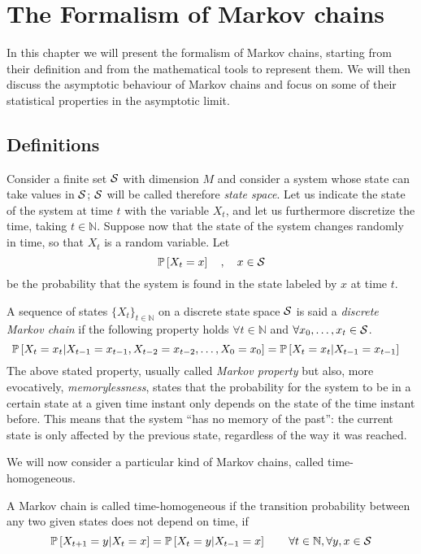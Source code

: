 \chapter{The Formalism of Markov chains}
In this chapter we will present the formalism of Markov chains, starting from their definition and from the mathematical tools to represent them. We will then discuss the asymptotic behaviour of Markov chains and focus on some of their statistical properties in the asymptotic limit.
\label{ch:markov_chains}
\section{Definitions}
Consider a finite set $\mathcal{S}$ with dimension $M$ and consider a system whose state can take values in $\mathcal{S}$; $\mathcal{S}$ will be called therefore \emph{state space}. Let us indicate the state of the system at time $t$ with the variable $X_t$, and let us furthermore discretize the time, taking $t \in \mathbb{N}$. Suppose now that the state of the system changes randomly in time, so that $X_t$ is a random variable. Let
\begin{equation}
    \mathbb{P}\left[X_t = x\right] \quad , \quad x \in \mathcal{S}
\end{equation}
be the probability that the system is found in the state labeled by $x$ at time $t$.

\begin{ndef}  \label{def:markov-chain}
    A sequence of states $\{X_t\}_{t\in \mathbb{N}}$ on a discrete state space $\mathcal{S}$ is said a \emph{discrete Markov chain} if the following property holds $\forall t \in \mathbb N$ and $\forall x_0, \dots, x_t \in \mathcal{S}$.
    \begin{equation}
        \mathbb{P}\left[ X_t = x_t | X_{t-1} = x_{t-1}, X_{t-2} = x_{t-2}, \dots, X_0 = x_0 \right] = \mathbb{P}\left[ X_t = x_t | X_{t-1} = x_{t-1} \right] \quad
    \end{equation}
The above stated property, usually called \emph{Markov property} but also, more evocatively, \emph{memorylessness}, states that the probability for the system to be in a certain state at a given time instant only depends on the state of the time instant before. This means that the system \enquote{has no memory of the past}: the current state is only affected by the previous state, regardless of the way it was reached.
\end{ndef}

We will now consider a particular kind of Markov chains, called time-homogeneous.
\begin{ndef}  A Markov chain is called time-homogeneous if the transition probability between any two given states does not depend on time, \ie if
    \begin{equation}
        \mathbb{P}\left[X_{t+1} = y | X_{t} = x\right] = \mathbb{P}\left[X_{t} = y | X_{t-1} = x\right] \quad \quad \forall t\in \mathbb{N}, \forall y, x \in \mathcal{S}
    \end{equation}
\end{ndef}

